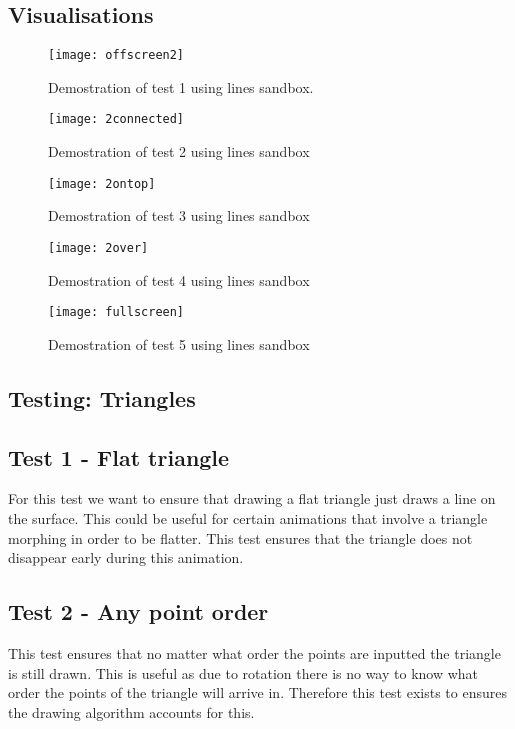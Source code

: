 \documentclass[
	letterpaper, %
	10pt, %
]{CSUniSchoolLabReport}
\begin{document}
\subsection*{Visualisations}
\begin{figure}[H]
	\centering
	\begin{minipage}[b]{0.4\textwidth}
		\texttt{[image: offscreen2]}
		\caption{Demostration of test 1 using lines sandbox.}
	\end{minipage}
	\hfill
	\begin{minipage}[b]{0.4\textwidth}
		\texttt{[image: 2connected]}
		\caption{Demostration of test 2 using lines sandbox}
  	\end{minipage}
\end{figure}
\begin{figure}[H]
	\centering
	\begin{minipage}[b]{0.4\textwidth}
		\texttt{[image: 2ontop]}
		\caption{Demostration of test 3 using lines sandbox}
	\end{minipage}
	\hfill
	\begin{minipage}[b]{0.4\textwidth}
		\texttt{[image: 2over]}
		\caption{Demostration of test 4 using lines sandbox}
  	\end{minipage}
\end{figure}
\begin{figure}[H]
	\centering
	\texttt{[image: fullscreen]}
	\caption{Demostration of test 5 using lines sandbox}	
\end{figure}
\subsection{Testing: Triangles}
\subsection*{Test 1 {-} Flat triangle}
For this test we want to ensure that drawing a flat triangle just draws a line on the surface.
This could be useful for certain animations that involve a triangle morphing in order to be flatter. 
This test ensures that the triangle does not disappear early during this animation.
\subsection*{Test 2 {-} Any point order}
This test ensures that no matter what order the points are inputted the triangle is still drawn.
This is useful as due to rotation there is no way to know what order the points of the triangle will 
arrive in. Therefore this test exists to ensures the drawing algorithm accounts for this.
\end{document}
